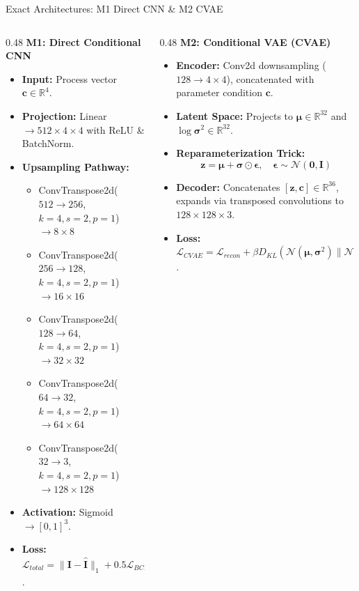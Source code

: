 \documentclass[aspectratio=169]{beamer}
\begin{document}
\begin{frame}{Exact Architectures: M1 Direct CNN \& M2 CVAE}
	\begin{columns}[T]
		\begin{column}{0.48\textwidth}
			\textbf{M1: Direct Conditional CNN}
			\begin{itemize}
				\scriptsize
				\item \textbf{Input:} Process vector $\mathbf{c} \in \mathbb{R}^4$.
				\item \textbf{Projection:} Linear $\to 512 \times 4 \times 4$ with ReLU \& BatchNorm.
				\item \textbf{Upsampling Pathway:}
				\begin{itemize}
					\tiny
					\item ConvTranspose2d($512 \to 256$, $k=4, s=2, p=1$) $\to 8\times 8$
					\item ConvTranspose2d($256 \to 128$, $k=4, s=2, p=1$) $\to 16\times 16$
					\item ConvTranspose2d($128 \to 64$, $k=4, s=2, p=1$) $\to 32\times 32$
					\item ConvTranspose2d($64 \to 32$, $k=4, s=2, p=1$) $\to 64\times 64$
					\item ConvTranspose2d($32 \to 3$, $k=4, s=2, p=1$) $\to 128\times 128$
				\end{itemize}
				\scriptsize
				\item \textbf{Activation:} Sigmoid $\to [0, 1]^3$.
				\item \textbf{Loss:} $\mathcal{L}_{total} = \|\mathbf{I} - \hat{\mathbf{I}}\|_1 + 0.5 \mathcal{L}_{BCE}(\mathbf{M}, \hat{\mathbf{M}})$.
			\end{itemize}
		\end{column}
		\begin{column}{0.48\textwidth}
			\textbf{M2: Conditional VAE (CVAE)}
			\begin{itemize}
				\scriptsize
				\item \textbf{Encoder:} Conv2d downsampling ($128 \to 4\times 4$), concatenated with parameter condition $\mathbf{c}$.
				\item \textbf{Latent Space:} Projects to $\boldsymbol{\mu} \in \mathbb{R}^{32}$ and $\log \boldsymbol{\sigma}^2 \in \mathbb{R}^{32}$.
				\item \textbf{Reparameterization Trick:}
				$$\mathbf{z} = \boldsymbol{\mu} + \boldsymbol{\sigma} \odot \boldsymbol{\epsilon}, \quad \boldsymbol{\epsilon} \sim \mathcal{N}(\mathbf{0}, \mathbf{I})$$
				\item \textbf{Decoder:} Concatenates $[\mathbf{z}, \mathbf{c}] \in \mathbb{R}^{36}$, expands via transposed convolutions to $128 \times 128 \times 3$.
				\item \textbf{Loss:} $\mathcal{L}_{CVAE} = \mathcal{L}_{recon} + \beta D_{KL}(\mathcal{N}(\boldsymbol{\mu}, \boldsymbol{\sigma}^2) \parallel \mathcal{N}(\mathbf{0}, \mathbf{I}))$.
			\end{itemize}
		\end{column}
	\end{columns}
\end{frame}
\end{document}

